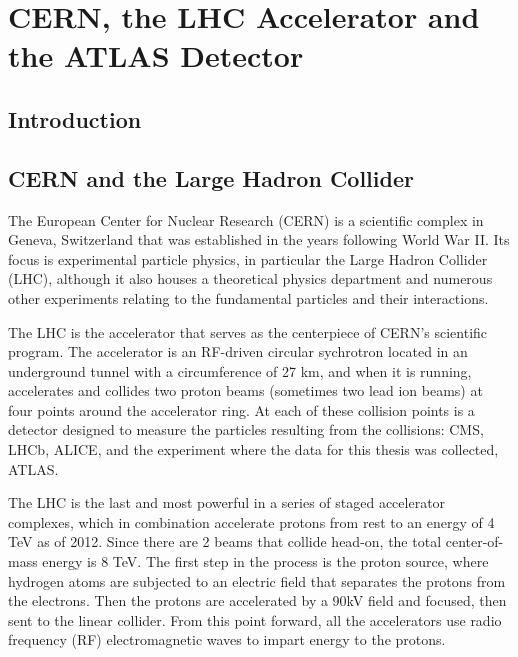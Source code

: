  

\chapter[ATLAS Detector]{CERN, the LHC Accelerator and the ATLAS Detector}




\section{Introduction}

\section{CERN and the Large Hadron Collider}
\label{sec:cern_lhc}
The European Center for Nuclear Research (CERN) is a scientific complex in Geneva, Switzerland that was established in the years following World War II.  Its focus is experimental particle physics, in particular the Large Hadron Collider (LHC), although it also houses a theoretical physics department and numerous other experiments relating to the fundamental particles and their interactions.  

The LHC is the accelerator that serves as the centerpiece of CERN's scientific program.  The accelerator is an RF-driven circular sychrotron located in an underground tunnel with a circumference of 27 km, and when it is running, accelerates and collides two proton beams (sometimes two lead ion beams) at four points around the accelerator ring.  At each of these collision points is a detector designed to measure the particles resulting from the collisions: CMS, LHCb, ALICE, and the experiment where the data for this thesis was collected, ATLAS.

The LHC is the last and most powerful in a series of staged accelerator complexes, which in combination accelerate protons from rest to an energy of 4 TeV as of 2012.  Since there are 2 beams that collide head-on, the total center-of-mass energy is 8 TeV.  The first step in the process is the proton source, where hydrogen atoms are subjected to an electric field that separates the protons from the electrons.  Then the protons are accelerated by a 90kV field and focused, then sent to the linear collider.  From this point forward, all the accelerators use radio frequency (RF) electromagnetic waves to impart energy to the protons.  

